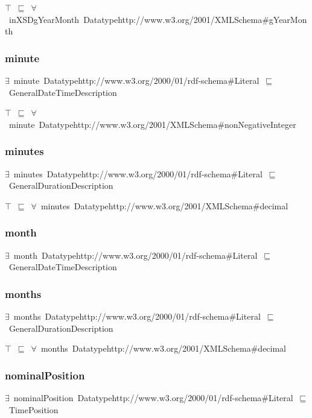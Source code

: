 \documentclass{article}
\begin{document}
\ensuremath{\top}~\ensuremath{\sqsubseteq}~\ensuremath{\forall}~inXSDgYearMonth~Datatypehttp://www.w3.org/2001/XMLSchema#gYearMonth

\subsubsection*{minute}

\ensuremath{\exists}~minute~Datatypehttp://www.w3.org/2000/01/rdf-schema#Literal~\ensuremath{\sqsubseteq}~GeneralDateTimeDescription

\ensuremath{\top}~\ensuremath{\sqsubseteq}~\ensuremath{\forall}~minute~Datatypehttp://www.w3.org/2001/XMLSchema#nonNegativeInteger

\subsubsection*{minutes}

\ensuremath{\exists}~minutes~Datatypehttp://www.w3.org/2000/01/rdf-schema#Literal~\ensuremath{\sqsubseteq}~GeneralDurationDescription

\ensuremath{\top}~\ensuremath{\sqsubseteq}~\ensuremath{\forall}~minutes~Datatypehttp://www.w3.org/2001/XMLSchema#decimal

\subsubsection*{month}

\ensuremath{\exists}~month~Datatypehttp://www.w3.org/2000/01/rdf-schema#Literal~\ensuremath{\sqsubseteq}~GeneralDateTimeDescription

\subsubsection*{months}

\ensuremath{\exists}~months~Datatypehttp://www.w3.org/2000/01/rdf-schema#Literal~\ensuremath{\sqsubseteq}~GeneralDurationDescription

\ensuremath{\top}~\ensuremath{\sqsubseteq}~\ensuremath{\forall}~months~Datatypehttp://www.w3.org/2001/XMLSchema#decimal

\subsubsection*{nominalPosition}

\ensuremath{\exists}~nominalPosition~Datatypehttp://www.w3.org/2000/01/rdf-schema#Literal~\ensuremath{\sqsubseteq}~TimePosition
\end{document}
